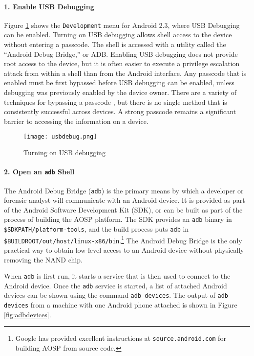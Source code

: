 \paragraph {1. 
Enable USB Debugging} Figure \ref{fig:usbdebug} shows the \texttt{Development} menu for Android 2.3, where USB Debugging can be
enabled.  Turning on USB debugging allows shell access to the device without entering a passcode. The shell is accessed with a
utility called the ``Android Debug Bridge,'' or ADB. Enabling USB debugging does not provide root access to the device, but it is
often easier to execute a privilege escalation attack from within a shell than from the Android interface. Any passcode that is
enabled must be first bypassed before USB debugging can be enabled, unless debugging was previously enabled by the device owner.
There are a variety of techniques for bypassing a passcode \cite{hoog, lockscreenbypass0, lockscreenbypass1, lockscreenbypass2}, but
there is no single method that is consistently successful across devices.  A strong passcode remains a significant barrier to
accessing the information on a device.

\begin{figure}[htb]
\caption{Turning on USB debugging}
\begin{center}\texttt{[image: usbdebug.png]}\end{center}
\label{fig:usbdebug}
\end{figure}

\paragraph {2. Open an \texttt{adb}  Shell}

The Android Debug Bridge (\texttt{adb}) is the primary means by which a developer or forensic analyst will communicate with an
Android device. It is provided as part of the Android Software Development Kit (SDK), or can be built as part of the process of
building the AOSP platform. The SDK provides an \texttt{adb} binary in \texttt{\$SDKPATH/platform-tools}, and the build process puts
\texttt{adb} in \texttt{\$BUILDROOT/out/host/linux-x86/bin}.\footnote{Google has provided excellent instructions at
\texttt{source.android.com} for building AOSP from source code.}  The Android Debug Bridge is the only practical way to obtain
low-level access to an Android device without physically removing the NAND chip.

When \texttt{adb} is first run, it starts a service that is then used to connect to the Android device. 
Once the \texttt{adb} service is started, a list of attached Android devices can be shown using the command \texttt{adb devices}. 
The output of \texttt{adb devices} from a machine with one Android phone attached is shown in Figure \ref{fig:adbdevices}.

